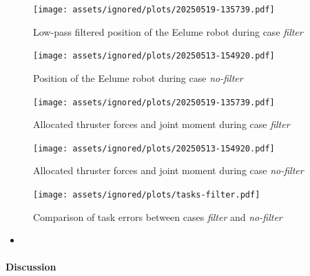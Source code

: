 \begin{figure}[h!]
    \centering
    \texttt{[image: assets/ignored/plots/20250519-135739.pdf]}
    \caption{Low-pass filtered position of the Eelume robot during case \textit{filter}}
    \label{fig:results:tpc:filter:pos}
\end{figure}
\begin{figure}[h!]
    \centering
    \texttt{[image: assets/ignored/plots/20250513-154920.pdf]}
    \caption{Position of the Eelume robot during case \textit{no-filter}}
    \label{fig:results:tpc:no-filter:pos}
\end{figure}
\begin{figure}[h!]
    \centering
    \texttt{[image: assets/ignored/plots/20250519-135739.pdf]}
    \caption{Allocated thruster forces and joint moment during case \textit{filter}}
    \label{fig:results:tpc:filter:forces}
\end{figure}
\begin{figure}[h!]
    \centering
    \texttt{[image: assets/ignored/plots/20250513-154920.pdf]}
    \caption{Allocated thruster forces and joint moment during case \textit{no-filter}}
    \label{fig:results:tpc:no-filter:forces}
\end{figure}
\begin{figure}[h!]
    \centering
    \texttt{[image: assets/ignored/plots/tasks-filter.pdf]}
    \caption{Comparison of task errors between cases \textit{filter} and \textit{no-filter}}
    \label{fig:results:tpc:filter:task-errors}
\end{figure}

\begin{itemize}
    \item 
\end{itemize}

\paragraph{Discussion}
\label{sec:results:lowpass}




